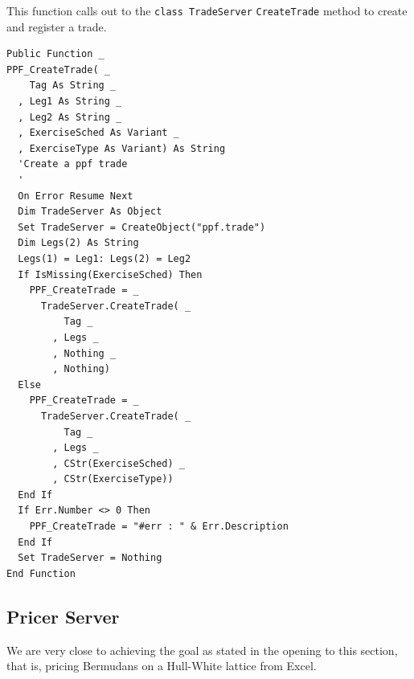 This function calls out to the \verb|class TradeServer|
\verb|CreateTrade| method to create and register a trade.
\begin{verbatim}
Public Function _
PPF_CreateTrade( _
    Tag As String _
  , Leg1 As String _
  , Leg2 As String _
  , ExerciseSched As Variant _
  , ExerciseType As Variant) As String
  'Create a ppf trade
  '
  On Error Resume Next
  Dim TradeServer As Object
  Set TradeServer = CreateObject("ppf.trade")
  Dim Legs(2) As String
  Legs(1) = Leg1: Legs(2) = Leg2
  If IsMissing(ExerciseSched) Then
    PPF_CreateTrade = _
      TradeServer.CreateTrade( _
          Tag _
        , Legs _
        , Nothing _
        , Nothing)
  Else
    PPF_CreateTrade = _
      TradeServer.CreateTrade( _
          Tag _
        , Legs _
        , CStr(ExerciseSched) _
        , CStr(ExerciseType))
  End If
  If Err.Number <> 0 Then
    PPF_CreateTrade = "#err : " & Err.Description
  End If
  Set TradeServer = Nothing
End Function
\end{verbatim}

\subsection{Pricer Server}\label{subsec:pricer-server}

We are very close to achieving the goal as stated in the opening to
this section, that is, pricing Bermudans on a Hull-White lattice from
Excel.

